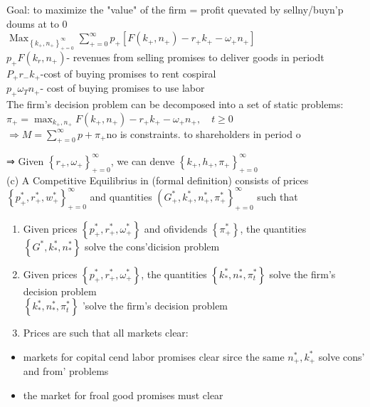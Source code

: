 \documentclass[10pt]{article}
\begin{document}
Goal: to maximize the "value" of the firm = profit quevated by sellny/buyn'p doums at to 0\\
$\operatorname{Max}_{\left\{k_{+}, n_{+}\right\}_{+=0}^{\infty}} \sum_{+=0}^{\infty} p_{+}\left[F\left(k_{+}, n_{+}\right)-r_{+} k_{+}-\omega_{+} n_{+}\right]$\\
$p_{+} F\left(k_{r}, n_{+}\right)$- revenues from selling promises to deliver goods in periodt\\
$P_{+} r_{-} k_{+}$-cost of buying promises to rent cospiral\\
$p_{+} \omega_{T} n_{+}$- cost of buying promises to use labor\\
The firm's decision problem can be decomposed into a set of static problems:\\
$\pi_{+}=\max _{k_{+}, n_{+}} F\left(k_{+}, n_{+}\right)-r_{+} k_{+}-\omega_{+} n_{+}, \quad t \geqslant 0$\\
$\Rightarrow M=\sum_{+=0}^{\infty} p+\pi_{+}$no is constraints. to shareholders in period o

⇒ Given $\left\{r_{+}, \omega_{+}\right\}_{+=0}^{\infty}$, we can denve $\left\{k_{+}, h_{+}, \pi_{+}\right\}_{+=0}^{\infty}$\\
(c) A Competitive Equilibrius in (formal definition) consists of prices $\left\{p_{+}^{*}, r_{+}^{*}, w_{+}^{*}\right\}_{+=0}^{\infty}$ and quantities $\left(G_{+}^{*}, k_{+}^{*}, n_{+}^{*}, \pi_{+}^{*}\right\}_{+=0}^{\infty}$ such that

\begin{enumerate}
  \item Given prices $\left\{p_{+}^{*}, r_{+}^{*}, \omega_{+}^{*}\right\}$ and ofividends $\left\{\pi_{+}^{*}\right\}$, the quantities $\left\{G^{*}, k_{*}^{*}, n_{*}^{*}\right\}$ solve the cons'dicision problem
  \item Given prices $\left\{p_{+}^{*}, r_{+}^{*}, \omega_{+}^{*}\right\}$, the quantities $\left\{k_{*}^{*}, n_{*}^{*}, \pi_{t}^{*}\right\}$ solve the firm's decision problem\\
$\left\{k_{*}^{*}, n_{*}^{*}, \pi_{t}^{*}\right\}$ 'solve the firm's decision problem
  \item Prices are such that all markets clear:
\end{enumerate}

\begin{itemize}
  \item markets for copital cend labor promises clear sirce the same $n_{+}^{*}, k_{+}^{*}$ solve cons' and from' problems
  \item the market for froal good promises must clear
\end{itemize}
\end{document}
